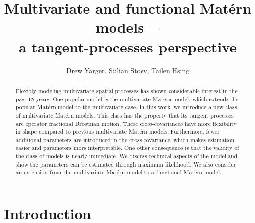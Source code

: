 \documentclass[11pt]{article}
\title{Multivariate and functional Mat\'ern models---\\a tangent-processes perspective}
\author{Drew Yarger, Stilian Stoev, Tailen Hsing}
\begin{document}
\maketitle

\begin{abstract}
Flexibly modeling multivariate spatial processes has shown considerable interest in the past 15 years. 
One popular model is the multivariate Mat\'ern model, which extends the popular Mat\'ern model to the multivariate case. 
In this work, we introduce a new class of multivariate Mat\'ern models.
This class has the property that its tangent processes are operator fractional Brownian motion. 
These cross-covariances have more flexibility in shape compared to previous multivariate Mat\'ern models. 
Furthermore, fewer additional parameters are introduced in the cross-covariance, which makes estimation easier and parameters more interpretable. One other consequence is that the validity of the class of models is nearly immediate. 
We discuss technical aspects of the model and show the parameters can be estimated through maximum likelihood.
We also consider an extension from the multivariate Mat\'ern model to a functional Mat\'ern model.
\end{abstract}

\section{Introduction}
\end{document}
